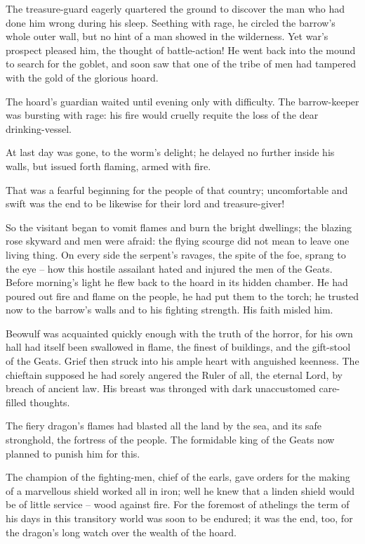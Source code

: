 \documentclass[a4paper]{article}
\begin{document}
{The treasure-guard eagerly
quartered the ground to discover the man
who had done him wrong during his sleep.
Seething with rage, he circled the barrow’s
whole outer wall, but no hint of a man
showed in the wilderness. Yet war’s prospect pleased him,
the thought of battle-action! He went back into the mound
to search for the goblet, and soon saw that one
of the tribe of men had tampered with the gold
of the glorious hoard.

The hoard’s guardian
waited until evening only with difficulty.
The barrow-keeper was bursting with rage:
his fire would cruelly requite the loss
of the dear drinking-vessel.

At last day was gone,
to the worm’s delight; he delayed no further
inside his walls, but issued forth flaming,
armed with fire.

That was a fearful beginning
for the people of that country; uncomfortable and swift
was the end to be likewise for their lord and treasure-giver!

So the visitant began to vomit flames
and burn the bright dwellings; the blazing rose skyward
and men were afraid: the flying scourge
did not mean to leave one living thing.
On every side the serpent’s ravages,
the spite of the foe, sprang to the eye –
how this hostile assailant hated and injured
the men of the Geats. Before morning’s light
he flew back to the hoard in its hidden chamber.
He had poured out fire and flame on the people,
he had put them to the torch; he trusted now to the barrow’s walls
and to his fighting strength. His faith misled him.

Beowulf was acquainted quickly enough
with the truth of the horror, for his own hall had itself
been swallowed in flame, the finest of buildings,
and the gift-stool of the Geats. Grief then struck
into his ample heart with anguished keenness.
The chieftain supposed he had sorely angered
the Ruler of all, the eternal Lord,
by breach of ancient law. His breast was thronged
with dark unaccustomed care-filled thoughts.

The fiery dragon’s flames had blasted
all the land by the sea, and its safe stronghold,
the fortress of the people. The formidable king
of the Geats now planned to punish him for this.

The champion of the fighting-men, chief of the earls,
gave orders for the making of a marvellous shield
worked all in iron; well he knew
that a linden shield would be of little service
– wood against fire. For the foremost of athelings
the term of his days in this transitory world
was soon to be endured; it was the end, too, for the dragon’s
long watch over the wealth of the hoard.

}
\end{document}
